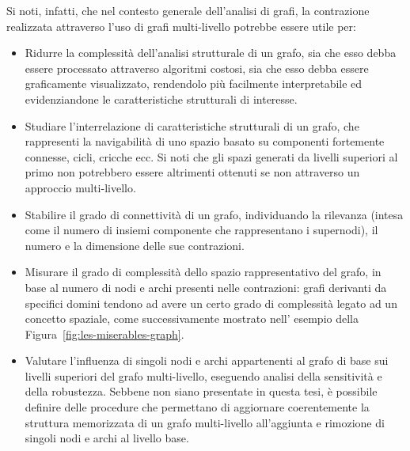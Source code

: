 Si noti, infatti, che nel contesto generale dell'analisi di grafi, la contrazione realizzata attraverso
l'uso di grafi multi-livello potrebbe essere utile per:
\begin{itemize}
    \item Ridurre la complessit\`a dell'analisi strutturale di un grafo, sia che esso debba essere processato
    attraverso algoritmi costosi, sia che esso debba essere graficamente visualizzato, rendendolo pi\`u facilmente
    interpretabile ed evidenziandone le caratteristiche strutturali di interesse.
    \item Studiare l'interrelazione di caratteristiche strutturali di un grafo, che rappresenti la navigabilit\`a
    di uno spazio basato su componenti fortemente connesse, cicli, cricche ecc.
    Si noti che gli spazi generati da livelli superiori al primo non potrebbero essere altrimenti ottenuti se
    non attraverso un approccio multi-livello.
    \item Stabilire il grado di connettivit\`a di un grafo, individuando la rilevanza (intesa come il numero di
    insiemi componente che rappresentano i supernodi), il numero e la dimensione delle sue contrazioni.
    \item Misurare il grado di complessit\`a dello spazio rappresentativo del grafo, in base al numero
    di nodi e archi presenti nelle contrazioni: grafi derivanti da specifici domini tendono ad avere un certo
    grado di complessit\`a legato ad un concetto spaziale, come successivamente mostrato nell'
    esempio della Figura~\ref{fig:les-miserables-graph}.
    \item Valutare l'influenza di singoli nodi e archi appartenenti al grafo di base sui livelli superiori
    del grafo multi-livello, eseguendo analisi della sensitivit\`a e della robustezza.
    Sebbene non siano presentate in questa tesi, è possibile definire delle procedure che permettano di aggiornare
    coerentemente la struttura memorizzata di un grafo multi-livello all'aggiunta e rimozione di singoli nodi e
    archi al livello base.
\end{itemize}

